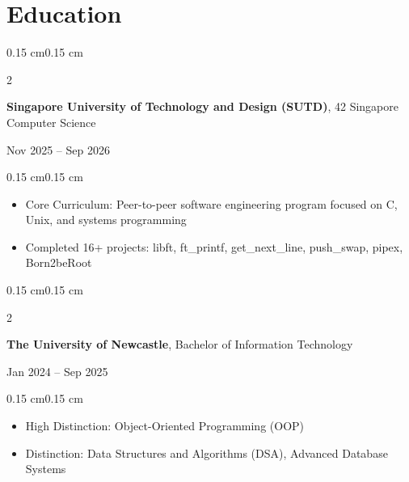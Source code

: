 \documentclass[10pt, letterpaper]{article}
\newenvironment{highlights}{
    \begin{itemize}[
        topsep=0.08 cm,
        parsep=0.05 cm,
        partopsep=0pt,
        itemsep=0pt,
        leftmargin=0.4 cm
    ]
}{
    \end{itemize}
}
\newenvironment{onecolentry}{
    \begin{adjustwidth}{0.15 cm}{0.15 cm}
}{
    \end{adjustwidth}
}
\newenvironment{twocolentry}[2][]{
    \onecolentry
    \def\secondColumn{#2}
    \setcolumnwidth{\fill, 4.5 cm}
    \begin{paracol}{2}
}{
    \switchcolumn \raggedleft \secondColumn
    \end{paracol}
    \endonecolentry
}
\begin{document}
    \section{Education}

        \begin{twocolentry}{
            Nov 2025 -- Sep 2026
        }
            \textbf{Singapore University of Technology and Design (SUTD)}, 42 Singapore Computer Science
        \end{twocolentry}  
        \vspace{0.08 cm}
        \begin{onecolentry}
            \begin{highlights}
                \item Core Curriculum: Peer-to-peer software engineering program focused on C, Unix, and systems programming
                \item Completed 16+ projects: libft, ft\_printf, get\_next\_line, push\_swap, pipex, Born2beRoot
            \end{highlights}
        \end{onecolentry}

        \vspace{0.15 cm}

        \begin{twocolentry}{
            Jan 2024 -- Sep 2025
        }
            \textbf{The University of Newcastle}, Bachelor of Information Technology
        \end{twocolentry}  
        \vspace{0.08 cm}
        \begin{onecolentry}
            \begin{highlights}
                \item High Distinction: Object-Oriented Programming (OOP)
                \item Distinction: Data Structures and Algorithms (DSA), Advanced Database Systems
            \end{highlights}
        \end{onecolentry}
\end{document}
